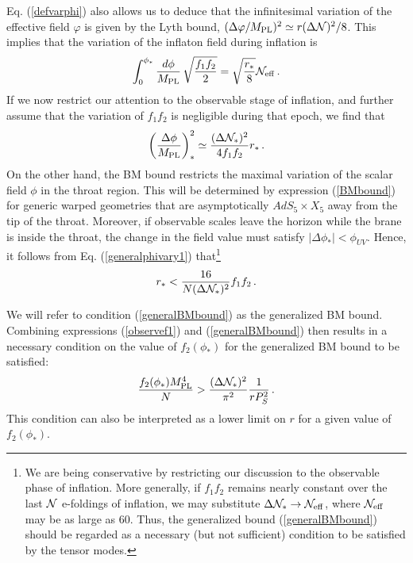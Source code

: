 Eq. (\ref{defvarphi}) also allows us to deduce 
that the infinitesimal variation of the effective 
field $\varphi$ is given by the Lyth bound, 
$(\Delta \varphi /M_{\mathrm{PL}} )^2 \simeq 
r (\Delta {\cal{N}})^2/8$. This implies that 
the variation of the inflaton field during inflation is 
\begin{equation}
\label{newbit}
\int_0^{\phi_{*}} \frac{d\phi}{M_{\mathrm{PL}}} \, \sqrt{\frac{f_1f_2}{2}} 
= \sqrt{\frac{r_*}{8}}  {\cal{N}}_{\mathrm{eff}} \,.
\end{equation}
If we now restrict our attention to 
the observable stage of inflation, and further assume that the variation
of $f_1f_2$ is negligible during that epoch, we find that 
\begin{equation}
\label{generalphivary1}
\left( \frac{\Delta \phi}{M_{\mathrm{PL}}} \right)^2_{*} \simeq 
\frac{(\Delta {\cal{N}}_{*} )^2}{4 f_1f_2} r_*  \,.
\end{equation}
On the other hand, the BM bound restricts the maximal 
variation of the scalar field $\phi$ in the throat region. 
This will be determined by expression (\ref{BMbound}) 
for generic warped geometries that are asymptotically 
$AdS_5 \times X_5$ away from the tip of the throat. Moreover, 
if observable scales leave the horizon 
while the brane is inside the throat, the change in the field value 
must satisfy $| \Delta \phi_*|<\phi_{UV}$. Hence, it follows from   
Eq. (\ref{generalphivary1}) that\footnote{We are 
being conservative by restricting our discussion to the 
observable phase of inflation. More generally, if 
$f_1f_2$ remains nearly constant over the last ${\cal{N}}$ 
e-foldings of inflation, 
we may substitute $\Delta {\cal{N}}_* \rightarrow 
{\cal{N}}_{\mathrm{eff}}$, where ${\cal{N}}_{\mathrm{eff}}$ 
may be as large as 60. Thus, the generalized bound 
(\ref{generalBMbound}) should be regarded as a necessary 
(but not sufficient) condition to be satisfied by the tensor modes.} 
\begin{equation}
\label{generalBMbound}
r_*< \frac{16}{N (\Delta {\cal{N}}_{*})^2} f_1f_2  \,.
\end{equation}

We will refer to condition 
(\ref{generalBMbound}) as the 
generalized BM bound. 
Combining expressions (\ref{observef1}) and (\ref{generalBMbound}) then
results in a necessary condition on the value of $f_2(\phi_*)$ 
for the generalized BM bound to be satisfied: 
\begin{equation}
\label{f2bound}
\frac{f_2 (\phi_*)M_{\mathrm{PL}}^4}{N} > \frac{(\Delta {\cal{N}}_*)^2}{\pi^2} 
\frac{1}{rP_S^2} \,.
\end{equation}
This condition can also be interpreted as a lower limit on $r$ 
for a given value of $f_2 (\phi_*)$.  

